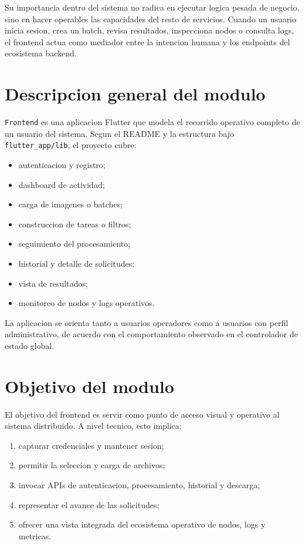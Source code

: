 \documentclass[conference]{IEEEtran}
\begin{document}
Su importancia dentro del sistema no radica en ejecutar logica pesada de negocio, sino en hacer operables las capacidades del resto de servicios. Cuando un usuario inicia sesion, crea un batch, revisa resultados, inspecciona nodos o consulta logs, el frontend actua como mediador entre la intencion humana y los endpoints del ecosistema backend.

\section{Descripcion general del modulo}
\texttt{Frontend} es una aplicacion Flutter que modela el recorrido operativo completo de un usuario del sistema. Segun el README y la estructura bajo \texttt{flutter\_app/lib}, el proyecto cubre:

\begin{itemize}[leftmargin=*]
\item autenticacion y registro;
\item dashboard de actividad;
\item carga de imagenes o batches;
\item construccion de tareas o filtros;
\item seguimiento del procesamiento;
\item historial y detalle de solicitudes;
\item vista de resultados;
\item monitoreo de nodos y logs operativos.
\end{itemize}

La aplicacion se orienta tanto a usuarios operadores como a usuarios con perfil administrativo, de acuerdo con el comportamiento observado en el controlador de estado global.

\section{Objetivo del modulo}
El objetivo del frontend es servir como punto de acceso visual y operativo al sistema distribuido. A nivel tecnico, esto implica:

\begin{enumerate}[leftmargin=*]
\item capturar credenciales y mantener sesion;
\item permitir la seleccion y carga de archivos;
\item invocar APIs de autenticacion, procesamiento, historial y descarga;
\item representar el avance de las solicitudes;
\item ofrecer una vista integrada del ecosistema operativo de nodos, logs y metricas.
\end{enumerate}
\end{document}
